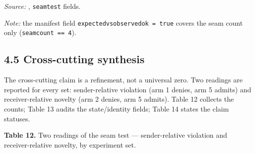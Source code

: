 \documentclass[
  10pt,
]{article}
\let\origtexttt\texttt
\renewcommand{\texttt}[1]{{\upshape\origtexttt{#1}}}
\renewcommand{\_}{\allowbreak\origunderscore}
\begin{document}
\emph{Source:} ,
\texttt{seam\_test} fields.

\emph{Note:} the manifest field
\texttt{expected\_vs\_observed\_ok\ =\ true} covers the seam count only
(\texttt{seam\_count\ ==\ 4}).

\subsection{4.5 Cross-cutting synthesis}\label{cross-cutting-synthesis}

The cross-cutting claim is a refinement, not a universal zero. Two
readings are reported for every set: sender-relative violation (arm 1
denies, arm 5 admits) and receiver-relative novelty (arm 2 denies, arm 5
admits). Table 12 collects the counts; Table 13 audits the
state/identity fields; Table 14 states the claim statuses.

\textbf{Table 12.} Two readings of the seam test --- sender-relative
violation and receiver-relative novelty, by experiment set.
\end{document}
